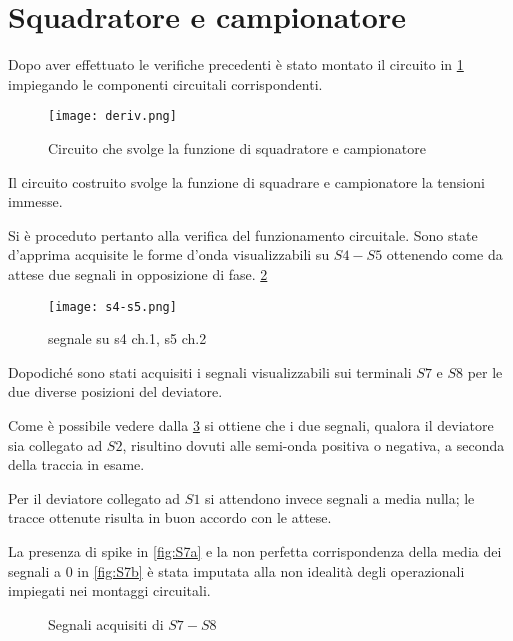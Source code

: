 \section{Squadratore e campionatore}
	Dopo aver effettuato le verifiche precedenti è stato montato il 
	circuito in 
	\figurename{ \ref{fig:sqd} }
	impiegando le componenti circuitali corrispondenti.
	
	\begin{figure}[ht]
		\centering
		\texttt{[image: deriv.png]}
		\caption{Circuito che svolge la funzione di squadratore e campionatore}
		\label{fig:sqd}
	\end{figure}

	Il circuito costruito svolge la funzione di squadrare e campionatore la tensioni immesse.
	
	Si è proceduto pertanto alla verifica del funzionamento circuitale.
	Sono state d'apprima acquisite le forme d'onda visualizzabili su $S4-S5$
	ottenendo come da attese due segnali in opposizione di fase.
	\figurename{ \ref{f:s4-s5} }
	
	\begin{figure}[ht]
		\centering
		\texttt{[image: s4-s5.png]}
		\caption{segnale su s4 ch.1, s5 ch.2 }
		\label{f:s4-s5}
	\end{figure}
	
	Dopodiché sono stati acquisiti i segnali visualizzabili sui terminali $S7$ e $S8$
	per le due diverse posizioni del deviatore.
	
	Come è possibile vedere dalla \figurename{\ref{fig:s7}} si ottiene che i due segnali, qualora il
	deviatore sia collegato ad $S2$,  risultino dovuti alle semi-onda
	positiva o negativa, a seconda della traccia in esame.
	
	Per il deviatore collegato ad $S1$
	si attendono invece segnali a media nulla; le tracce ottenute risulta in buon accordo 
	con le attese.
	
	La presenza di spike in \figurename{\ref{fig:S7a}} e la non perfetta corrispondenza della media dei segnali a $0$ in \figurename{\ref{fig:S7b}} è stata imputata alla non idealità 
	degli operazionali impiegati nei montaggi circuitali.
	\begin{figure}[h]
		\centering
		\caption{Segnali acquisiti di $S7-S8$}
		\label{fig:s7}
	\end{figure}
